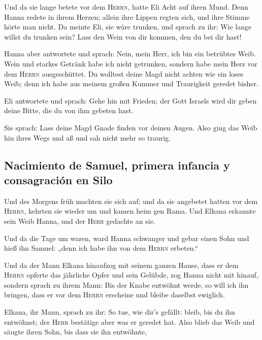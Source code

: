  Und da sie lange betete vor dem \textsc{Herrn}, hatte
Eli Acht auf ihren Mund.  Denn Hanna redete in ihrem
Herzen; allein ihre Lippen regten sich, und ihre Stimme hörte man nicht.
Da meinte Eli, sie wäre trunken,  und sprach zu ihr: Wie
lange willst du trunken sein? Lass den Wein von dir kommen, den du bei
dir hast!

 Hanna aber antwortete und sprach: Nein, mein Herr, ich
bin ein betrübtes Weib. Wein und starkes Getränk habe ich nicht
getrunken, sondern habe mein Herz vor dem \textsc{Herrn} ausgeschüttet.
 Du wolltest deine Magd nicht achten wie ein loses Weib;
denn ich habe aus meinem großen Kummer und Traurigkeit geredet bisher.

 Eli antwortete und sprach: Gehe hin mit Frieden; der
Gott Israels wird dir geben deine Bitte, die du von ihm gebeten hast.

 Sie sprach: Lass deine Magd Gnade finden vor deinen
Augen. Also ging das Weib hin ihres Wegs und aß und sah nicht mehr so
traurig.

\hypertarget{nacimiento-de-samuel-primera-infancia-y-consagraciuxf3n-en-silo}{%
\subsection{Nacimiento de Samuel, primera infancia y consagración en
Silo}\label{nacimiento-de-samuel-primera-infancia-y-consagraciuxf3n-en-silo}}

 Und des Morgens früh machten sie sich auf; und da sie
angebetet hatten vor dem \textsc{Herrn}, kehrten sie wieder um und kamen
heim gen Rama. Und Elkana erkannte sein Weib Hanna, und der
\textsc{Herr} gedachte an sie.

 Und da die Tage um waren, ward Hanna schwanger und gebar
einen Sohn und hieß ihn Samuel: „denn ich habe ihn von dem
\textsc{Herrn} erbeten.``

 Und da der Mann Elkana hinaufzog mit seinem ganzen
Hause, dass er dem \textsc{Herrn} opferte das jährliche Opfer und sein
Gelübde,  zog Hanna nicht mit hinauf, sondern sprach zu
ihrem Mann: Bis der Knabe entwöhnt werde, so will ich ihn bringen, dass
er vor dem \textsc{Herrn} erscheine und bleibe daselbst ewiglich.

 Elkana, ihr Mann, sprach zu ihr: So tue, wie dir's
gefällt: bleib, bis du ihn entwöhnst; der \textsc{Herr} bestätige aber
was er geredet hat. Also blieb das Weib und säugte ihren Sohn, bis dass
sie ihn entwöhnte,

